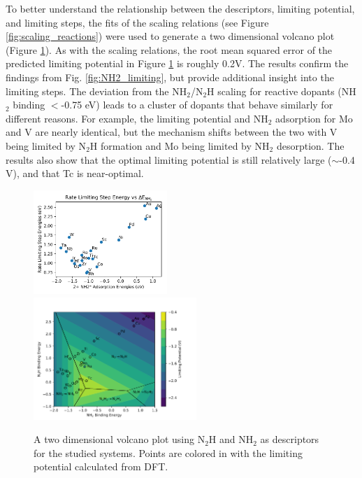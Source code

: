 To better understand the relationship between the descriptors, limiting potential, and limiting steps, the fits of the scaling relations (see Figure \ref{fig:scaling_reactions}) were used to generate a two dimensional volcano plot (Figure \ref{fig:2d_plot}). As with the scaling relations, the root mean squared error of the predicted limiting potential in Figure \ref{fig:2d_plot} is roughly 0.2V. The results confirm the findings from Fig. \ref{fig:NH2_limiting}, but provide additional insight into the limiting steps. The deviation from the NH$_2$/N$_2$H scaling for reactive dopants (NH$_2$ binding $<$-0.75 eV) leads to a cluster of dopants that behave similarly for different reasons. For example, the limiting potential and NH$_2$ adsorption for Mo and V are nearly identical, but the mechanism shifts between the two with V being limited by N$_2$H formation and Mo being limited by NH$_2$ desorption. The results also show that the optimal limiting potential is still relatively large ($\sim$-0.4 V), and that Tc is near-optimal.

\begin{figure}

    \centering
    \includegraphics[width=0.45\textwidth]{Images/NH2_v_rate_limiting.pdf}
    \includegraphics[width=0.55\textwidth]{Images/2d_scaling_plot.pdf}
    \caption{A two dimensional volcano plot using N$_2$H and NH$_2$ as descriptors for the studied systems. Points are colored in with the limiting potential calculated from DFT.}
    \label{fig:2d_plot}
\end{figure}




